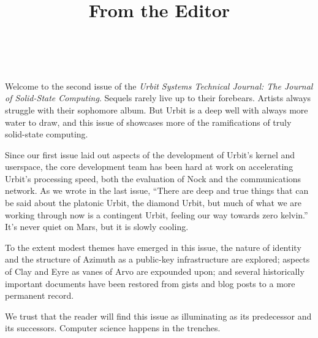 \documentclass[twoside]{article}
\title{From the Editor}
\author{\authorname~\authorpatp \\ \affiliation}
\date{}
\begin{document}
\thispagestyle{firststyle}

\setcounter{page}{1}

Welcome to the second issue of the \emph{Urbit Systems Technical Journal:  The Journal of Solid-State Computing}.  Sequels rarely live up to their forebears.  Artists always struggle with their sophomore album.  But Urbit is a deep well with always more water to draw, and this issue of  showcases more of the ramifications of truly solid-state computing.

Since our first issue laid out aspects of the development of Urbit's kernel and userspace, the core development team has been hard at work on accelerating Urbit's processing speed, both the evaluation of Nock and the communications network.  As we wrote in the last issue, ``There are deep and true things that can be said about the platonic Urbit, the diamond Urbit, but much of what we are working through now is a contingent Urbit, feeling our way towards zero kelvin.''  It's never quiet on Mars, but it is slowly cooling.

To the extent modest themes have emerged in this issue, the nature of identity and the structure of Azimuth as a public-key infrastructure are explored; aspects of Clay and Eyre as vanes of Arvo are expounded upon; and several historically important documents have been restored from gists and blog posts to a more permanent record.

We trust that the reader will find this issue as illuminating as its predecessor and its successors.  Computer science happens in the trenches.  \tombstone{}
\end{document}
